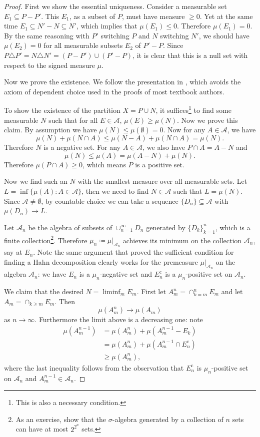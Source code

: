 \documentclass[10pt,oneside]{book}
\numberwithin{equation}{chapter}
\theoremstyle{plain-star}
\theoremstyle{definition-star}
\theoremstyle{remark-star}
\theoremstyle{plain-star}
\newcommand{\A}{\mathcal{A}}
\newcommand{\cpl}{\mathrm{c}}
\begin{document}
\begin{proof}
    First we show the essential uniqueness. Consider a measurable set $E_1 \subseteq P - P'$. This $E_1$, as a subset of $P$, must have measure $\geq 0$. Yet at the same time $E_1 \subseteq N' - N\subseteq N'$, which implies that $\mu(E_1)\leq 0$. Therefore $\mu(E_1) = 0$. By the same reasoning with $P'$ switching $P$ and $N$ switching $N'$, we should have $\mu(E_2) = 0$ for all measurable subsets $E_2$ of $P'-P$. Since $P\triangle P' = N \triangle N' = (P - P')\cup(P' - P)$, it is clear that this is a null set with respect to the signed measure $\mu$.

    Now we prove the existence. We follow the presentation in \cite{Falkner_2019}, which avoids the axiom of dependent choice used in the proofs of most textbook authors.

    To show the existence of the partition $X = P \cup N$, it suffices\footnote{This is also a necessary condition.} to find some measurable $N$ such that for all $E \in \A$, $\mu(E)\geq \mu(N)$. Now we prove this claim. By assumption we have $\mu(N)\leq \mu(\emptyset) = 0$. Now for any $A \in \A$, we have \[
        \mu(N) + \mu(N\cap A) \leq \mu(N-A) + \mu(N\cap A) = \mu(N).
    \] Therefore $N$ is a negative set. For any $A \in \A$, we also have $P\cap A = A - N$ and \[
        \mu(N) \leq \mu(A) = \mu(A - N) + \mu(N).
    \] Therefore $\mu(P\cap A)\geq 0$, which means $P$ is a positive set.
    
    Now we find such an $N$ with the smallest measure over all measurable sets. Let $L = \inf\{\mu(A): A\in \A\}$, then we need to find $N \in \A$ such that $L = \mu(N)$. Since $\A \neq \emptyset$, by countable choice we can take a sequence $\{D_n\}\subseteq \A$ with $\mu(D_n)\to L$.

    Let $\A_n$ be the algebra of subsets of $\cup_{n=1}^\infty D_n$ generated by $\{D_k\}_{k=1}^n$, which is a finite collection\footnote{As an exercise, show that the $\sigma$-algebra generated by a collection of $n$ sets can have at most $2^{2^n}$ sets.}. Therefore $\mu_n \coloneqq \mu|_{\A_n}$ achieves its minimum on the collection $\A_n$, say at $E_n$. Note the same argument that proved the sufficient condition for finding a Hahn decomposition clearly works for the premeasure $\mu|_{\A_n}$ on the algebra $\A_n$: we have $E_n$ is a $\mu_n$-negative set and $E_n^\cpl$ is a $\mu_n$-positive set on $\A_n$.

    We claim that the desired $N = \liminf_m E_m$. First let $A_m^n=\cap_{k=m}^n E_m$ and let $A_m = \cap_{k\geq m}E_m$. Then  \[\mu(A_m^n)\to \mu(A_m)\] as $n\to \infty$. Furthermore the limit above is a decreasing one: note \begin{align*}
        \mu(A_m^{n-1}) & = \mu(A_m^n) + \mu(A_m^{n-1} - E_k) \\
        & = \mu(A_m^n) + \mu(A_m^{n-1}\cap E_n^\cpl) \\
        & \geq \mu(A_m^n), 
    \end{align*}
    where the last inequality follows from the observation that $E_n^\cpl$ is $\mu_n$-positive set on $\A_n$ and $A_m^{n-1} \in \A_n$.


\end{proof}
\end{document}

